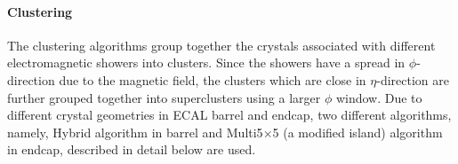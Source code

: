 \paragraph{Clustering}
\hspace{\parindent} The clustering algorithms group together the crystals associated with different electromagnetic showers into clusters.
Since the showers have a spread in $\phi$-direction due to the magnetic field, the clusters which
are close in $\eta$-direction are further grouped together into superclusters using a larger $\phi$ window.
Due to different crystal geometries in ECAL barrel and
endcap, two different algorithms, namely, Hybrid algorithm in barrel and Multi5$\times$5 (a modified island) algorithm in endcap, described in detail below are used. 

\vspace{-0.2in}
